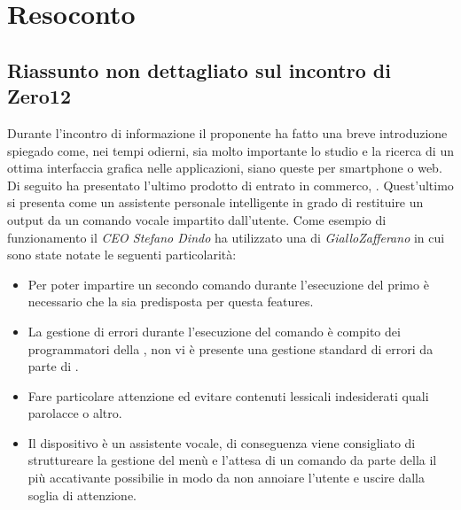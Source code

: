 \clearpage
\section{Resoconto}
	\subsection{Riassunto non dettagliato sul incontro di Zero12}
	Durante l'incontro di informazione il proponente ha fatto una breve introduzione spiegado come, nei tempi odierni, sia molto importante lo studio e la ricerca di un ottima interfaccia grafica nelle applicazioni, siano queste per smartphone o web. 
	Di seguito ha presentato l'ultimo prodotto di  entrato in commerco,  . Quest'ultimo si presenta come un assistente personale intelligente in grado di restituire un output da un comando vocale impartito dall'utente. 
	Come esempio di funzionamento il \emph{CEO Stefano Dindo} ha utilizzato una  di \emph{GialloZafferano} in cui sono state notate le seguenti particolarità:
	\begin{itemize}
		\item Per poter impartire un secondo comando durante l'esecuzione del primo è necessario che la  sia predisposta per questa features.
		\item La gestione di errori durante l'esecuzione del comando è compito dei programmatori della , non vi è presente una gestione standard di errori da parte di .
		\item Fare particolare attenzione ed evitare contenuti lessicali indesiderati quali parolacce o altro.
		\item Il dispositivo è un assistente vocale, di conseguenza viene consigliato di struttureare la gestione del menù e l'attesa di un comando da parte della  il più accativante possibilie in modo da non annoiare l'utente e uscire dalla soglia di attenzione.
	\end{itemize}
	
